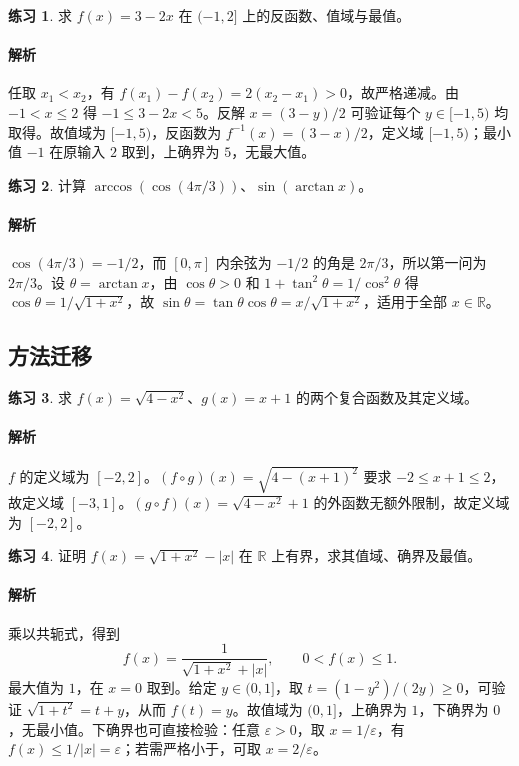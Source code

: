 \documentclass[UTF8,fontset=fandol,12pt,oneside,openany]{ctexrep}
\newcommand{\R}{\mathbb R}
\theoremstyle{definition}
\newtheorem{exercise}{练习}[chapter]
\begin{document}
\begin{exercise}
求 $f(x)=3-2x$ 在 $(-1,2]$ 上的反函数、值域与最值。
\end{exercise}
\paragraph{解析} 任取 $x_1<x_2$，有 $f(x_1)-f(x_2)=2(x_2-x_1)>0$，故严格递减。由 $-1<x\le2$ 得 $-1\le3-2x<5$。反解 $x=(3-y)/2$ 可验证每个 $y\in[-1,5)$ 均取得。故值域为 $[-1,5)$，反函数为 $f^{-1}(x)=(3-x)/2$，定义域 $[-1,5)$；最小值 $-1$ 在原输入 $2$ 取到，上确界为 $5$，无最大值。

\begin{exercise}
计算 $\arccos(\cos(4\pi/3))$、$\sin(\arctan x)$。
\end{exercise}
\paragraph{解析} $\cos(4\pi/3)=-1/2$，而 $[0,\pi]$ 内余弦为 $-1/2$ 的角是 $2\pi/3$，所以第一问为 $2\pi/3$。设 $\theta=\arctan x$，由 $\cos\theta>0$ 和 $1+\tan^2\theta=1/\cos^2\theta$ 得 $\cos\theta=1/\sqrt{1+x^2}$，故 $\sin\theta=\tan\theta\cos\theta=x/\sqrt{1+x^2}$，适用于全部 $x\in\R$。

\subsection{方法迁移}
\begin{exercise}
求 $f(x)=\sqrt{4-x^2}$、$g(x)=x+1$ 的两个复合函数及其定义域。
\end{exercise}
\paragraph{解析} $f$ 的定义域为 $[-2,2]$。$(f\circ g)(x)=\sqrt{4-(x+1)^2}$ 要求 $-2\le x+1\le2$，故定义域 $[-3,1]$。$(g\circ f)(x)=\sqrt{4-x^2}+1$ 的外函数无额外限制，故定义域为 $[-2,2]$。

\begin{exercise}
证明 $f(x)=\sqrt{1+x^2}-|x|$ 在 $\R$ 上有界，求其值域、确界及最值。
\end{exercise}
\paragraph{解析} 乘以共轭式，得到
\[
 f(x)=\frac1{\sqrt{1+x^2}+|x|},\qquad 0<f(x)\le1.
\]
最大值为 $1$，在 $x=0$ 取到。给定 $y\in(0,1]$，取 $t=(1-y^2)/(2y)\ge0$，可验证 $\sqrt{1+t^2}=t+y$，从而 $f(t)=y$。故值域为 $(0,1]$，上确界为 $1$，下确界为 $0$，无最小值。下确界也可直接检验：任意 $\varepsilon>0$，取 $x=1/\varepsilon$，有 $f(x)\le1/|x|=\varepsilon$；若需严格小于，可取 $x=2/\varepsilon$。
\end{document}
